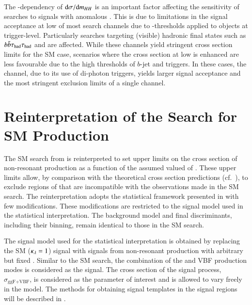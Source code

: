 The \klambda-dependency of $\mathrm{d}\sigma / \mathrm{d}m_{HH}$ is an
important factor affecting the sensitivity of searches to signals with
anomalous \klambda. This is due to limitations in the signal
acceptance at low \mHH of most search channels due to \pT-thresholds
applied to objects at trigger-level. Particularly searches targeting
(visible) hadronic final states such as $b\bar{b}\tau_{\text{had}}\tau_{\text{had}}$ and \bbbb are
affected. While these channels yield stringent cross section limits
for the SM case, scenarios where the cross section at low \mHH is
enhanced are less favourable due to the high thresholds of $b$-jet and
\tauhadvis triggers. In these cases, the \bbyy channel, due to its use
of di-photon triggers, yields larger signal acceptance and the most
stringent exclusion limits of a single channel.


\section{Reinterpretation of the Search for SM \HH Production}%
\label{sec:reinterpretation}

The SM \HH search from  is reinterpreted to set
upper limits on the cross section of non-resonant \HH production as a
function of the assumed valued of \klambda. These upper limits allow,
by comparison with the theoretical cross section predictions
(cf.~), to exclude regions of \klambda that are
incompatible with the observations made in the SM \HH search. The
reinterpretation adopts the statistical framework presented in
 with few modifications. These
modifications are restricted to the signal model used in the
statistical interpretation. The background model and final
discriminants, including their binning, remain identical to those in
the SM \HH search.

The signal model used for the statistical interpretation is obtained
by replacing the SM \HH ($\kappa_{\lambda} = 1$) signal with signals from
non-resonant \HH production with arbitrary but fixed \klambda. Similar
to the SM \HH search, the combination of the \ggF and VBF production
modes is considered as the signal. The cross section of the signal
process, $\sigma_{\text{ggF+VBF}}$, is considered as the parameter of
interest and is allowed to vary freely in the model. The methods for
obtaining signal templates in the signal regions will be described in
.

